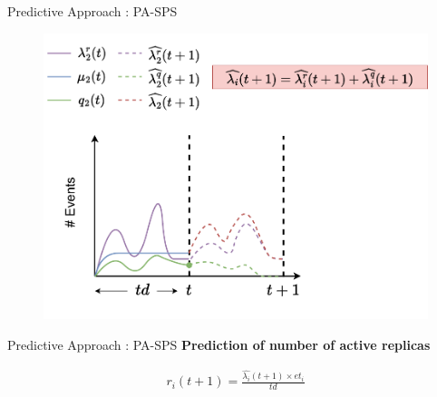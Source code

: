 \begin{frame}{Predictive Approach : PA-SPS}
\begin{figure}
    \centering
    \includegraphics[scale=0.63]{images/concepts/predictive/PA-SPS-Prediction-14.pdf}
\end{figure}
\end{frame}

\begin{frame}{Predictive Approach : PA-SPS}
	\textbf{Prediction of number of active replicas}

	\begin{align*}
		r_i(t+1) = \frac{\widehat{\lambda_i}(t+1) \times et_i}{td}
	\end{align*}
	
\end{frame}

